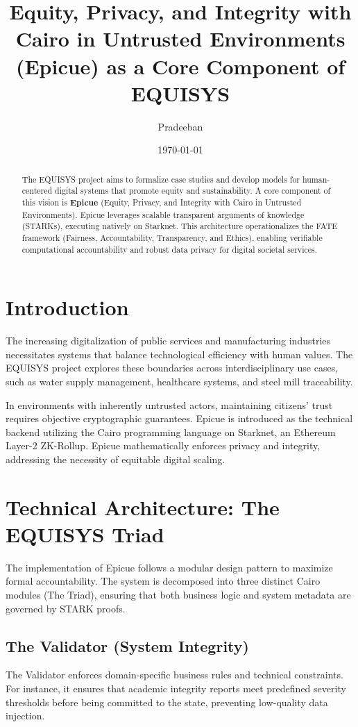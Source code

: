 \documentclass[12pt,a4paper]{article}
\title{Equity, Privacy, and Integrity with Cairo in Untrusted Environments (Epicue) as a Core Component of EQUISYS}
\author{Pradeeban}
\affil{EQUISYS Project Research Group}
\date{\today}
\begin{document}
\maketitle

\begin{abstract}
The EQUISYS project aims to formalize case studies and develop models for human-centered digital systems that promote equity and sustainability. A core component of this vision is \textbf{Epicue} (Equity, Privacy, and Integrity with Cairo in Untrusted Environments). Epicue leverages scalable transparent arguments of knowledge (STARKs), executing natively on Starknet. This architecture operationalizes the FATE framework (Fairness, Accountability, Transparency, and Ethics), enabling verifiable computational accountability and robust data privacy for digital societal services.
\end{abstract}

\section{Introduction}
The increasing digitalization of public services and manufacturing industries necessitates systems that balance technological efficiency with human values. The EQUISYS project explores these boundaries across interdisciplinary use cases, such as water supply management, healthcare systems, and steel mill traceability.

In environments with inherently untrusted actors, maintaining citizens' trust requires objective cryptographic guarantees. Epicue is introduced as the technical backend utilizing the Cairo programming language on Starknet, an Ethereum Layer-2 ZK-Rollup. Epicue mathematically enforces privacy and integrity, addressing the necessity of equitable digital scaling.

\section{Technical Architecture: The EQUISYS Triad}
The implementation of Epicue follows a modular design pattern to maximize formal accountability. The system is decomposed into three distinct Cairo modules (The Triad), ensuring that both business logic and system metadata are governed by STARK proofs.

\subsection{The Validator (System Integrity)}
The Validator enforces domain-specific business rules and technical constraints. For instance, it ensures that academic integrity reports meet predefined severity thresholds before being committed to the state, preventing low-quality data injection.
\end{document}
